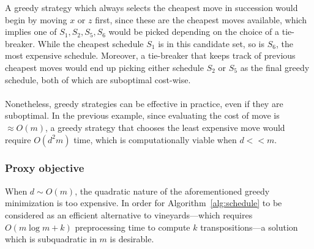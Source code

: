 \documentclass{siamart190516}
\begin{document}
A greedy strategy which always selects the cheapest move in succession would begin by moving $x$ or $z$ first, since these are the cheapest moves available, which implies one of $S_1, S_2, S_5, S_6$ would be picked depending on the choice of a tie-breaker. While the cheapest schedule $S_1$ is in this candidate set, so is $S_6$, the most expensive schedule. Moreover, a tie-breaker that keeps track of previous cheapest moves would end up picking either schedule $S_2$ or $S_5$ as the final greedy schedule, both of which are suboptimal cost-wise.  
\\
\\
\noindent
Nonetheless, greedy strategies can be effective in practice, even if they are suboptimal. In the previous example, since evaluating the cost of move is $\approx O(m)$, a greedy strategy that chooses the least expensive move would require $O(d^2 m)$ time, which is computationally viable when $d << m$. 

\subsubsection{Proxy objective}\label{sec:proxy_objective}
When $d \sim O(m)$, the quadratic nature of the aforementioned greedy minimization is too expensive. In order for Algorithm~\ref{alg:schedule} to be considered as an efficient alternative to vineyards---which requires $O(m \log m + k)$ preprocessing time to compute $k$ transpositions---a solution which is subquadratic in $m$ is desirable.  %
\end{document}

